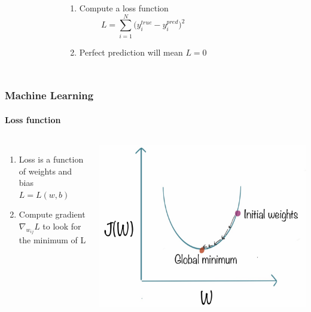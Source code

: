 \documentclass[aspectratio=43]{beamer}
\begin{document}
\begin{frame}
\begin{columns}
\begin{figure}
\begin{tikzpicture}
			\end{tikzpicture}
		\end{figure}

		\begin{enumerate}
			\item Compute a loss function
			\begin{equation*}
				L = \sum\limits_{i = 1}^{N} \big( y_{i}^{true} - y_{i}^{pred} \big)^{2}
			\end{equation*}
			\item Perfect prediction will mean $L = 0$
		\end{enumerate}

	\end{columns}

\end{frame}

\begin{frame}

	\frametitle{Machine Learning}
	\framesubtitle{Loss function}

	\begin{columns}
		
		
		\begin{enumerate}
			\item Loss is a function of weights and bias $L = L(w, b)$
			\item Compute gradient $\nabla_{w_{ij}} L$ to look for the minimum of L
		\end{enumerate}
		
	
			\includegraphics[width = \linewidth]{loss.png}
			
	\end{columns}

\end{frame}
\end{document}
